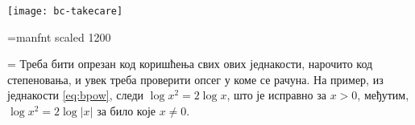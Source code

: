 \bigskip

\newcommand\takecare{\texttt{[image: bc-takecare]}}%
\robustify\takecare

\font\manfnt=manfnt scaled 1200 %
\def\dbend{{\manfnt\char126\relax}}
\def\danger{\hangindent=\parindent 
\hangafter=-2 \noindent\leavevmode
\smash{\hbox to 0pt{\kern-\hangindent\lower1.2pt\hbox{\dbend}\hss}}%
}


\danger\label{danger}%
Треба бити опрезан код коришћења свих ових једнакости, нарочито код степеновања,
и увек треба проверити опсег у коме се рачуна.
На пример, из једнакости \eqref{eq:bpow}, следи $\log x^2=2\log x$, што је исправно за $x>0$,
међутим, $\log x^2=2\log|x|$ за било које $x\ne0$. 
